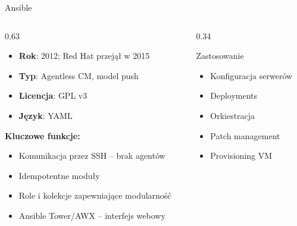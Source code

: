 \documentclass{beamer}
\begin{document}
\begin{frame}{Ansible}
    \begin{columns}[T]
        \begin{column}{0.63\textwidth}
            \begin{itemize}
                \item \textbf{Rok}: 2012; Red Hat przej\k{a}\l{} w 2015
                \item \textbf{Typ}: Agentless CM, model push
                \item \textbf{Licencja}: GPL v3
                \item \textbf{J\k{e}zyk}: YAML
            \end{itemize}
            \vspace{0.4em}
            \textbf{Kluczowe funkcje:}
            \begin{itemize}
                \item Komunikacja przez SSH -- brak agent\'ow
                \item Idempotentne modu\l{}y
                \item Role i kolekcje zapewniające modularno\'s\'c
                \item Ansible Tower/AWX -- interfejs webowy
            \end{itemize}
        \end{column}
        \begin{column}{0.34\textwidth}
            \begin{block}{Zastosowanie}
                \begin{itemize}
                    \item Konfiguracja serwer\'ow
                    \item Deployments
                    \item Orkiestracja
                    \item Patch management
                    \item Provisioning VM
                \end{itemize}
            \end{block}
        \end{column}
    \end{columns}
\end{frame}
\end{document}

